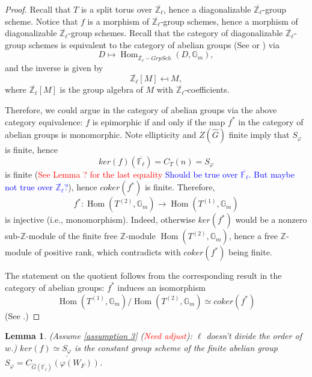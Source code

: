 \documentclass{article}
\newcommand{\red}[1]{\textcolor{red}{#1}}
\newcommand{\blue}[1]{\textcolor{blue}{#1}}
\newtheorem{lemma}{Lemma}
\newcommand{\Hom}{\operatorname{Hom}}
\begin{document}
\begin{proof}
	Recall that $T$ is a split torus over $\overline{\mathbb{Z}_{\ell}}$, hence a diagonalizable $\overline{\mathbb{Z}_{\ell}}$-group scheme. Notice that $f$ is a morphism of $\overline{\mathbb{Z}_{\ell}}$-group schemes, hence a morphism of diagonalizable $\overline{\mathbb{Z}_{\ell}}$-group schemes. Recall that the category of diagonalizable $\overline{\mathbb{Z}_{\ell}}$-group schemes is equivalent to the category of abelian groups (See \cite[p70, Section 5]{brochard2014autour} or \cite{conrad2014reductive}) via
	$$D \mapsto \Hom_{\overline{\mathbb{Z}_{\ell}}-GrpSch}(D, \mathbb{G}_m),$$
	and the inverse is given by 
	$$\overline{\mathbb{Z}_{\ell}}[M] \mapsfrom M,$$
	where $\overline{\mathbb{Z}_{\ell}}[M]$ is the group algebra of $M$ with $\overline{\mathbb{Z}_{\ell}}$-coefficients.
	
	Therefore, we could argue in the category of abelian groups via the above category equivalence: $f$ is epimorphic if and only if the map $f^*$ in the category of abelian groups is monomorphic. Note ellipticity and $Z(\hat{G})$ finite imply that $S_{\varphi}$ is finite, hence 
	$$ker(f)(\overline{\mathbb{F}_{\ell}})=C_T(n)=S_{\varphi}$$
	is finite (\red{See Lemma ? for the last equality} \blue{Should be true over $\overline{\mathbb{F}_{\ell}}$. But maybe not true over $\overline{\mathbb{Z}_{\ell}}$?}), hence $coker(f^*)$ is finite. Therefore, 
	$$f^*:\Hom(T^{(2)}, \mathbb{G}_m) \to \Hom(T^{(1)}, \mathbb{G}_m)$$
	is injective (i.e., monomorphism). Indeed, otherwise $ker(f^*)$ would be a nonzero sub-$\mathbb{Z}$-module of the finite free $\mathbb{Z}$-module $\Hom(T^{(2)}, \mathbb{G}_m)$, hence a free $\mathbb{Z}$-module of positive rank, which contradicts with $coker(f^*)$ being finite.
	
	The statement on the quotient follows from the corresponding result in the category of abelian groups: $f^*$ induces an isomorphism
	$$\Hom(T^{(1)}, \mathbb{G}_m)/\Hom(T^{(2)}, \mathbb{G}_m) \simeq coker(f^*)$$
	(See \cite[p71, Subsection 5.3]{brochard2014autour}.)
\end{proof}

\begin{lemma}\label{Lem ker(f)}
	(Assume \ref{assumption 3} (\red{Need adjust}): $\ell$ doesn't divide the order of $w$.) $ker(f) \simeq \underline{S_{\varphi}}$ is the constant group scheme of the finite abelian group $S_{\varphi}=C_{\hat{G}(\overline{\mathbb{F}_{\ell}})}(\varphi(W_F))$.
\end{lemma}
\end{document}
